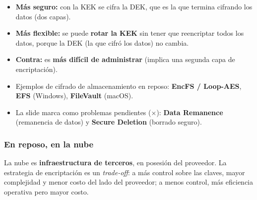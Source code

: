 \documentclass[11pt,a4paper]{article}
\begin{document}
\begin{itemize}[leftmargin=1.4em,itemsep=2pt]
  \item \textbf{Más seguro:} con la KEK se cifra la DEK, que es la que termina cifrando los
        datos (dos capas).
  \item \textbf{Más flexible:} se puede \textbf{rotar la KEK} sin tener que reencriptar todos
        los datos, porque la DEK (la que cifró los datos) no cambia.
  \item \textbf{Contra:} es \textbf{más difícil de administrar} (implica una segunda capa de
        encriptación).
  \item Ejemplos de cifrado de almacenamiento en reposo: \textbf{EncFS / Loop-AES},
        \textbf{EFS} (Windows), \textbf{FileVault} (macOS).
  \item La slide marca como problemas pendientes (\(\times\)): \textbf{Data Remanence}
        (remanencia de datos) y \textbf{Secure Deletion} (borrado seguro).
\end{itemize}

\subsubsection*{En reposo, en la nube}

La nube es \textbf{infraestructura de terceros}, en posesión del proveedor. La estrategia de
encriptación es un \emph{trade-off}: a más control sobre las claves, mayor complejidad y menor
costo del lado del proveedor; a menos control, más eficiencia operativa pero mayor costo.

\begin{center}
\end{center}
\end{document}
